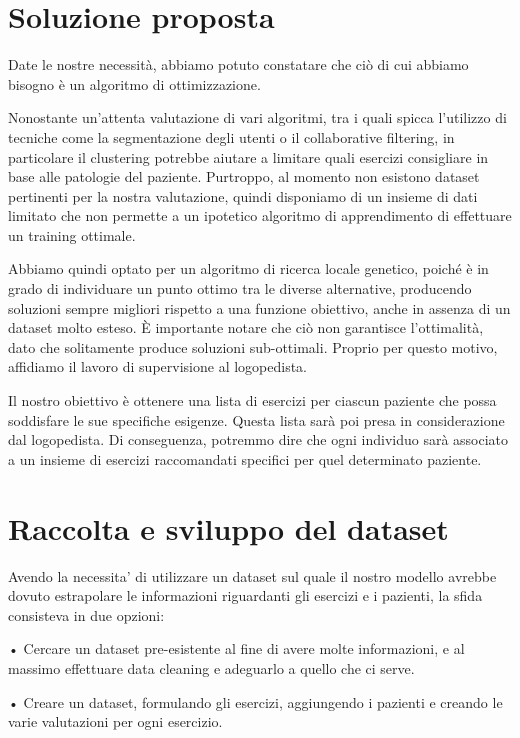 \documentclass{article}
\begin{document}
    \section{Soluzione proposta}

    Date le nostre necessità, abbiamo potuto constatare che ciò di cui abbiamo bisogno è un algoritmo di ottimizzazione.

    Nonostante un'attenta valutazione di vari algoritmi, tra i quali spicca l'utilizzo di tecniche come la segmentazione degli utenti o il collaborative filtering,
    in particolare il clustering potrebbe aiutare a limitare quali esercizi consigliare in base alle patologie del paziente. Purtroppo, al momento non esistono
    dataset pertinenti per la nostra valutazione, quindi disponiamo di un insieme di dati limitato che non permette a un ipotetico algoritmo di apprendimento di
    effettuare un training ottimale.

    Abbiamo quindi optato per un algoritmo di ricerca locale genetico, poiché è in grado di individuare un punto ottimo tra le diverse alternative, producendo
    soluzioni sempre migliori rispetto a una funzione obiettivo, anche in assenza di un dataset molto esteso. È importante notare che ciò non garantisce l'ottimalità,
    dato che solitamente produce soluzioni sub-ottimali. Proprio per questo motivo, affidiamo il lavoro di supervisione al logopedista.

    Il nostro obiettivo è ottenere una lista di esercizi per ciascun paziente che possa soddisfare le sue specifiche esigenze. Questa lista sarà poi presa in
    considerazione dal logopedista. Di conseguenza, potremmo dire che ogni individuo sarà associato a un insieme di esercizi raccomandati specifici per quel determinato
    paziente.

    \section{Raccolta e sviluppo del dataset}

    Avendo la necessita' di utilizzare un dataset sul quale il nostro modello avrebbe dovuto estrapolare le informazioni riguardanti gli esercizi e i pazienti, la sfida
    consisteva in due opzioni:


    • Cercare un dataset pre-esistente al fine di avere molte informazioni, e al massimo effettuare data cleaning e adeguarlo a quello che ci serve.


    • Creare un dataset, formulando gli esercizi, aggiungendo i pazienti e creando le varie valutazioni per ogni esercizio.
\end{document}
